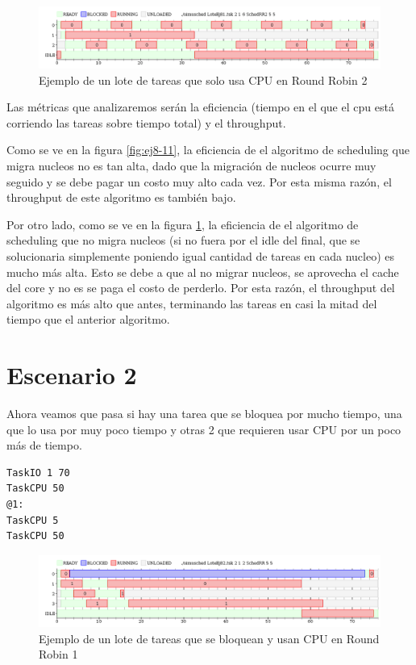 \begin{figure}[H]
\caption{Ejemplo de un lote de tareas que solo usa CPU en Round Robin 2}
\label{fig:ej8-12}
\includegraphics[width=0.9\columnwidth]{imgs/ej8-1rr2.png}
\end{figure}

Las métricas que analizaremos serán la eficiencia (tiempo en el que el cpu está corriendo las tareas sobre tiempo total) y el throughput.

Como se ve en la figura \ref{fig:ej8-11}, la eficiencia de el algoritmo de scheduling que migra nucleos no es tan alta, dado que la migración de nucleos ocurre muy seguido y se debe pagar un costo muy alto cada vez. Por esta misma razón, el throughput de este algoritmo es también bajo.

Por otro lado, como se ve en la figura \ref{fig:ej8-12}, la eficiencia de el algoritmo de scheduling que no migra nucleos (si no fuera por el idle del final, que se solucionaria simplemente poniendo igual cantidad de tareas en cada nucleo) es mucho más alta. Esto se debe a que al no migrar nucleos, se aprovecha el cache del core y no es se paga el costo de perderlo. Por esta razón, el throughput del algoritmo es más alto que antes, terminando las tareas en casi la mitad del tiempo que el anterior algoritmo.

\section{Escenario 2}

Ahora veamos que pasa si hay una tarea que se bloquea por mucho tiempo, una que lo usa por muy poco tiempo y otras 2 que requieren usar CPU por un poco más de tiempo.

\begin{lstlisting}
TaskIO 1 70
TaskCPU 50
@1:
TaskCPU 5
TaskCPU 50
\end{lstlisting}

\begin{figure}[H]
\caption{Ejemplo de un lote de tareas que se bloquean y usan CPU en Round Robin 1}
\label{fig:ej8-21}
\includegraphics[width=0.9\columnwidth]{imgs/ej8-2rr.png}
\end{figure}

